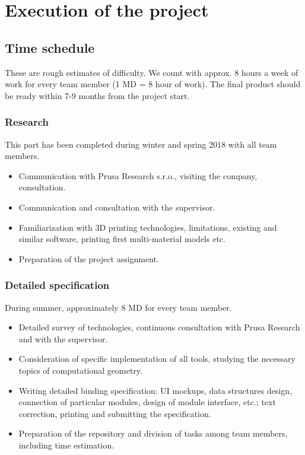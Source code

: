 \chapter{Execution of the project}

\section{Time schedule}

These are rough estimates of difficulty. We count with approx. 8 hours a week of work for every team member (1 MD = 8 hour of work). The final product should be ready within 7-9 months from the project start.


\subsection{Research}

This part has been completed during winter and spring 2018 with all team members.

\begin{itemize}
\item Communication with Prusa Research s.r.o., visiting the company, consultation.
\item Communication and consultation with the supervisor.
\item Familiarization with 3D printing technologies, limitations, existing and similar software, printing first multi-material models etc. 
\item Preparation of the project assignment.
\end{itemize}


\subsection{Detailed specification}

During summer, approximately 8 MD for every team member.

\begin{itemize}
\item Detailed survey of technologies, continuous consultation with Prusa Research and with the supervisor.
\item Consideration of specific implementation of all tools, studying the necessary topics of computational geometry.
\item Writing detailed binding specification: UI mockups, data structures design, connection of particular modules, design of module interface, etc.; text correction, printing and submitting the specification.
\item Preparation of the repository and division of tasks among team members, including time estimation.
\end{itemize}


